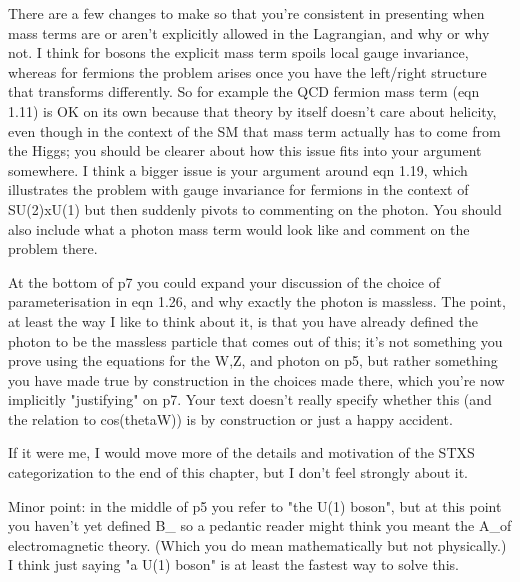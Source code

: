 There are a few changes to make so that you're consistent in presenting when mass terms 
are or aren't explicitly allowed in the Lagrangian, and why or why not. 
I think for bosons the explicit mass term spoils local gauge invariance, 
whereas for fermions the problem arises 
once you have the left/right structure that transforms differently.
So for example the QCD fermion mass term (eqn 1.11) is OK on its own 
because that theory by itself doesn't care about helicity, 
even though in the context of the SM that mass term actually has to come from the Higgs; 
you should be clearer about how this issue fits into your argument somewhere.
I think a bigger issue is your argument around eqn 1.19, 
which illustrates the problem with gauge invariance for fermions in the context of SU(2)xU(1) 
but then suddenly pivots to commenting on the photon.
You should also include what a photon mass term would look like and comment on the problem there.

At the bottom of p7 you could expand your discussion of the choice of parameterisation in eqn 1.26, 
and why exactly the photon is massless.
The point, at least the way I like to think about it, 
is that you have already defined the photon to be the massless particle that comes out of this; 
it's not something you prove using the equations for the W,Z, and photon on p5, 
but rather something you have made true by construction in the choices made there, 
which you're now implicitly "justifying" on p7.
Your text doesn't really specify whether this (and the relation to cos(thetaW)) 
is by construction or just a happy accident.

If it were me, I would move more of the details 
and motivation of the STXS categorization to the end of this chapter, 
but I don't feel strongly about it.

Minor point: in the middle of p5 you refer to "the U(1) boson", 
but at this point you haven't yet defined B_\mu 
so a pedantic reader might think you meant the A_\mu of electromagnetic theory. 
(Which you do mean mathematically but not physically.) 
I think just saying "a U(1) boson" is at least the fastest way to solve this.
